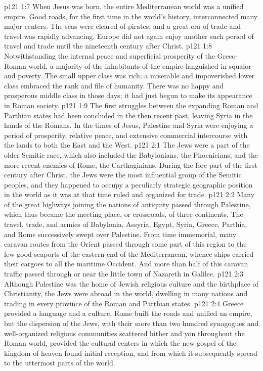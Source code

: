 \pc \vs p121 1:7 When Jesus was born, the entire Mediterranean world was a unified empire. Good roads, for the first time in the world’s history, interconnected many major centers. The seas were cleared of pirates, and a great era of trade and travel was rapidly advancing. Europe did not again enjoy another such period of travel and trade until the nineteenth century after Christ.
\vs p121 1:8 Notwithstanding the internal peace and superficial prosperity of the Greco\hyp{}Roman world, a majority of the inhabitants of the empire languished in squalor and poverty. The small upper class was rich; a miserable and impoverished lower class embraced the rank and file of humanity. There was no happy and prosperous middle class in those days; it had just begun to make its appearance in Roman society.
\vs p121 1:9 The first struggles between the expanding Roman and Parthian states had been concluded in the then recent past, leaving Syria in the hands of the Romans. In the times of Jesus, Palestine and Syria were enjoying a period of prosperity, relative peace, and extensive commercial intercourse with the lands to both the East and the West.
\vs p121 2:1 The Jews were a part of the older Semitic race, which also included the Babylonians, the Phoenicians, and the more recent enemies of Rome, the Carthaginians. During the fore part of the first century after Christ, the Jews were the most influential group of the Semitic peoples, and they happened to occupy a peculiarly strategic geographic position in the world as it was at that time ruled and organized for trade.
\vs p121 2:2 Many of the great highways joining the nations of antiquity passed through Palestine, which thus became the meeting place, or crossroads, of three continents. The travel, trade, and armies of Babylonia, Assyria, Egypt, Syria, Greece, Parthia, and Rome successively swept over Palestine. From time immemorial, many caravan routes from the Orient passed through some part of this region to the few good seaports of the eastern end of the Mediterranean, whence ships carried their cargoes to all the maritime Occident. And more than half of this caravan traffic passed through or near the little town of Nazareth in Galilee.
\vs p121 2:3 Although Palestine was the home of Jewish religious culture and the birthplace of Christianity, the Jews were abroad in the world, dwelling in many nations and trading in every province of the Roman and Parthian states.
\vs p121 2:4 Greece provided a language and a culture, Rome built the roads and unified an empire, but the dispersion of the Jews, with their more than two hundred synagogues and well\hyp{}organized religious communities scattered hither and yon throughout the Roman world, provided the cultural centers in which the new gospel of the kingdom of heaven found initial reception, and from which it subsequently spread to the uttermost parts of the world.
